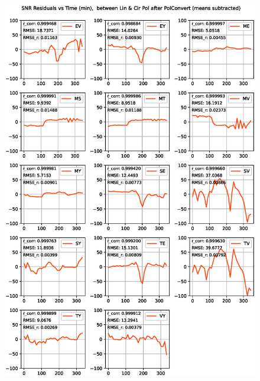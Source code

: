 \documentclass[letterpaper,twoside,12pt]{article}
\begin{document}
\begin{figure}[ht!]
  \begin{center}
  \includegraphics[width=33pc]{SNR_Lin_I_minus_Cir_I.eps}
  \caption{\small }
  \label{snr_lin_minus_cir}
  \end{center}
\end{figure}
\end{document}

